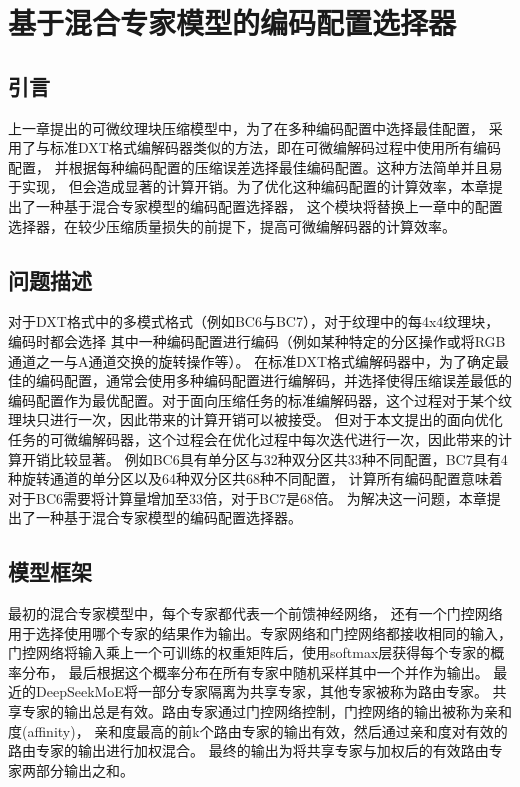 
\chapter{基于混合专家模型的编码配置选择器}

\section{引言}

上一章提出的可微纹理块压缩模型中，为了在多种编码配置中选择最佳配置，
采用了与标准DXT格式编解码器类似的方法，即在可微编解码过程中使用所有编码配置，
并根据每种编码配置的压缩误差选择最佳编码配置。这种方法简单并且易于实现，
但会造成显著的计算开销。为了优化这种编码配置的计算效率，本章提出了一种基于混合专家模型的编码配置选择器，
这个模块将替换上一章中的配置选择器，在较少压缩质量损失的前提下，提高可微编解码器的计算效率。

\section{问题描述}

对于DXT格式中的多模式格式（例如BC6与BC7），对于纹理中的每4x4纹理块，编码时都会选择
其中一种编码配置进行编码（例如某种特定的分区操作或将RGB通道之一与A通道交换的旋转操作等）。
在标准DXT格式编解码器中，为了确定最佳的编码配置，通常会使用多种编码配置进行编解码，并选择使得压缩误差最低的
编码配置作为最优配置。对于面向压缩任务的标准编解码器，这个过程对于某个纹理块只进行一次，因此带来的计算开销可以被接受。
但对于本文提出的面向优化任务的可微编解码器，这个过程会在优化过程中每次迭代进行一次，因此带来的计算开销比较显著。
例如BC6具有单分区与32种双分区共33种不同配置，BC7具有4种旋转通道的单分区以及64种双分区共68种不同配置，
计算所有编码配置意味着对于BC6需要将计算量增加至33倍，对于BC7是68倍。
为解决这一问题，本章提出了一种基于混合专家模型的编码配置选择器。

\section{模型框架}

最初的混合专家模型中，每个专家都代表一个前馈神经网络，
还有一个门控网络用于选择使用哪个专家的结果作为输出。专家网络和门控网络都接收相同的输入，
门控网络将输入乘上一个可训练的权重矩阵后，使用softmax层获得每个专家的概率分布，
最后根据这个概率分布在所有专家中随机采样其中一个并作为输出。
最近的DeepSeekMoE\cite{dai2024deepseekmoe}将一部分专家隔离为共享专家，其他专家被称为路由专家。
共享专家的输出总是有效。路由专家通过门控网络控制，门控网络的输出被称为亲和度(affinity)，
亲和度最高的前k个路由专家的输出有效，然后通过亲和度对有效的路由专家的输出进行加权混合。
最终的输出为将共享专家与加权后的有效路由专家两部分输出之和。

